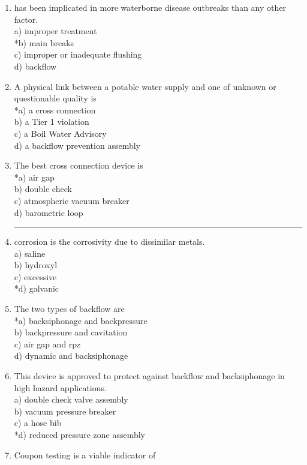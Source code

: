 \begin{enumerate}[1.]
 \item has been implicated in more waterborne disease outbreaks than any other factor.\\
a) improper treatment\\
*b) main breaks\\
c) improper or inadequate flushing\\
d) backflow\\
  \item A physical link between a potable water supply and one of unknown or questionable quality is\\
*a) a cross connection\\
b) a Tier 1 violation\\
c) a Boil Water Advisory\\
d) a backflow prevention assembly\\
  \item The best cross connection device is\\
*a) air gap\\
b) double check\\
c) atmospheric vacuum breaker\\
d) barometric loop\\
  \item \rule{2cm}{0.5pt}corrosion is the corrosivity due to dissimilar metals.\\
a) saline\\
b) hydroxyl\\
c) excessive\\
*d) galvanic\\
  \item The two types of backflow are\\
*a) backsiphonage and backpressure\\
b) backpressure and cavitation\\
c) air gap and rpz\\
d) dynamic and backsiphonage\\
  \item This device is approved to protect against backflow and backsiphonage in high hazard applications.\\
a) double check valve assembly\\
b) vacuum pressure breaker\\
c) a hose bib\\
*d) reduced pressure zone assembly\\
  \item Coupon testing is a viable indicator of\\

\end{enumerate}

